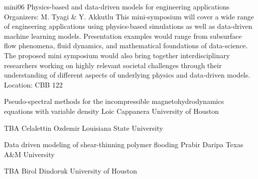 \mini
{mini06}
{Physics-based and data-driven models for engineering applications}
{Organizers: M. Tyagi \& Y. Akkutlu}
{This mini-symposium will cover a wide range of engineering applications using physics-based simulations as well as data-driven machine learning models. Presentation examples would range from subsurface flow phenomena, fluid dynamics, and mathematical foundations of data-science. The proposed mini symposium would also bring together interdisciplinary researchers working on highly relevant societal challenges through their understanding of different aspects of underlying physics and data-driven models.}
{Location: CBB 122}

\begin{talks}
\item\talk
{Pseudo-spectral methods for the incompressible magnetohydrodynamics equations with variable density}
{Loic Cappanera}
{University of Houston}
\item\talk
{TBA}
{Celalettin Ozdemir}
{Louisiana State University}
\item\talk
{Data driven modeling of shear-thinning polymer flooding}
{Prabir Daripa}
{Texas A\&M University}
\item\talk
{TBA}
{Birol Dindoruk}
{University of Houston}
\end{talks}
\room
